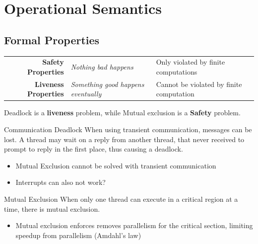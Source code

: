 \chapter{Operational Semantics}

\section{Formal Properties}
\begin{center}
    \begin{tabular}{r l l}
        \textbf{Safety Properties} & \textit{Nothing bad happens} & Only violated by finite computations \\
        \textbf{Liveness Properties} & \textit{Something good happens eventually} & Cannot be violated by finite computation \\
    \end{tabular}
\end{center}
Deadlock is a \textbf{liveness} problem, while Mutual exclusion is a \textbf{Safety} problem.

\begin{definitionbox}{Communication Deadlock}
    When using transient communication, messages can be lost. 
    A thread may wait on a reply from another thread, that never 
    received to prompt to reply in the first place, thus causing a deadlock.
\end{definitionbox}

\begin{itemize}
    \item Mutual Exclusion cannot be solved with transient communication
    \item Interrupts can also not work?
\end{itemize}

\begin{definitionbox}{Mutual Exclusion}
    When only one thread can execute in a critical region at a time, there is mutual exclusion.
    \begin{itemize}
        \item Mutual exclusion enforces removes parallelism for the critical section, limiting speedup from parallelism (Amdahl's law)
    \end{itemize}
\end{definitionbox}

